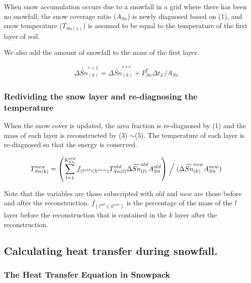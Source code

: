 When snow accumulation occurs due to a snowfall in a grid where there
has been no snowfall, the snow coverage ratio (\(A_{Sn}\)) is newly
diagnosed based on (1), and snow temperature (\(T_{Sn(1)}\)) is assumed
to be equal to the temperature of the first layer of soil.

We also add the amount of snowfall to the mass of the first layer.

\begin{eqnarray}
 \Delta \widetilde{Sn}_{(k)}^{\tau+1} = \Delta \widetilde{Sn}_{(k)}^{***} + P_{Sn}^* \Delta t_L /A_{Sn}
\end{eqnarray}

\hypertarget{redividing-the-snow-layer-and-re-diagnosing-the-temperature}{%
\subsubsection{Redividing the snow layer and re-diagnosing the
temperature}\label{redividing-the-snow-layer-and-re-diagnosing-the-temperature}}

When the snow cover is updated, the area fraction is re-diagnosed by (1)
and the mass of each layer is reconstructed by (3) \(\sim\)(5). The
temperature of each layer is re-diagnosed so that the energy is
conserved.

\begin{eqnarray}
 T_{Sn(k)}^{new} = \left(\sum_{l=1}^{K_{Sn}^{old}} f_{(l^{old}\in k^{new})} T_{Sn(l)}^{old} \Delta \widetilde{Sn}_{(l)}^{old} A_{Sn}^{old} \right)
\Bigm/ (\Delta \widetilde{Sn}_{(k)}^{new} A_{Sn}^{new})
\end{eqnarray}

Note that the variables are those subscripted with \(old\) and \(new\)
are those before and after the reconstruction.
\(f_{(l^{old}\in k^{new})}\) is the percentage of the mass of the \(l\)
layer before the reconstruction that is contained in the \(k\) layer
after the reconstruction.

\hypertarget{calculating-heat-transfer-during-snowfall.}{%
\subsection{Calculating heat transfer during
snowfall.}\label{calculating-heat-transfer-during-snowfall.}}

\hypertarget{the-heat-transfer-equation-in-snowpack}{%
\subsubsection{The Heat Transfer Equation in
Snowpack}\label{the-heat-transfer-equation-in-snowpack}}


